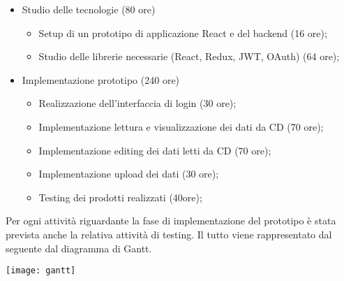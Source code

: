 \begin{itemize}
  \item Studio delle tecnologie (80 ore)
        \begin{itemize}
          \item Setup di un prototipo di applicazione React e del backend (16 ore);
          \item Studio delle librerie necessarie (React, Redux, JWT, OAuth) (64 ore);
        \end{itemize}
  \item Implementazione prototipo (240 ore)
        \begin{itemize}
          \item Realizzazione dell’interfaccia di login (30 ore);
          \item Implementazione lettura e visualizzazione dei dati da CD (70 ore);
          \item Implementazione editing dei dati letti da CD (70 ore);
          \item Implementazione upload dei dati (30 ore);
          \item Testing dei prodotti realizzati (40ore);
        \end{itemize}
\end{itemize}

Per ogni attività riguardante la fase di implementazione del prototipo è stata prevista anche la relativa attività di testing.
Il tutto viene rappresentato dal seguente dal diagramma di Gantt.
\begin{center}
  \texttt{[image: gantt]}
\end{center}